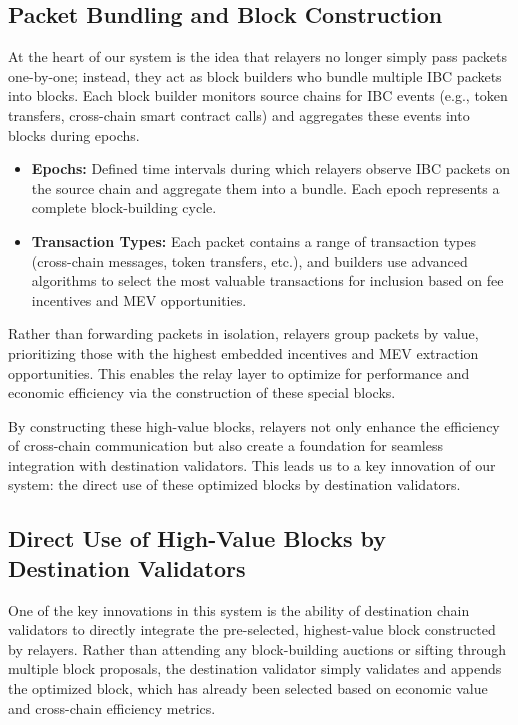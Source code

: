 \documentclass{article}
\begin{document}
\subsection{Packet Bundling and Block Construction}

At the heart of our system is the idea that relayers no longer simply pass packets one-by-one; instead, they act as block builders who bundle multiple IBC packets into blocks. Each block builder monitors source chains for IBC events (e.g., token transfers, cross-chain smart contract calls) and aggregates these events into blocks during epochs.

\begin{itemize}
    \item \textbf{Epochs:} Defined time intervals during which relayers observe IBC packets on the source chain and aggregate them into a bundle. Each epoch represents a complete block-building cycle.
    \item \textbf{Transaction Types:} Each packet contains a range of transaction types (cross-chain messages, token transfers, etc.), and builders use advanced algorithms to select the most valuable transactions for inclusion based on fee incentives and MEV opportunities.
\end{itemize}

Rather than forwarding packets in isolation, relayers group packets by value, prioritizing those with the highest embedded incentives and MEV extraction opportunities. This enables the relay layer to optimize for performance and economic efficiency via the construction of these special blocks.

By constructing these high-value blocks, relayers not only enhance the efficiency of cross-chain communication but also create a foundation for seamless integration with destination validators. This leads us to a key innovation of our system: the direct use of these optimized blocks by destination validators.

\subsection{Direct Use of High-Value Blocks by Destination Validators}

One of the key innovations in this system is the ability of destination chain validators to directly integrate the pre-selected, highest-value block constructed by relayers. Rather than attending any block-building auctions or sifting through multiple block proposals, the destination validator simply validates and appends the optimized block, which has already been selected based on economic value and cross-chain efficiency metrics.
\end{document}
